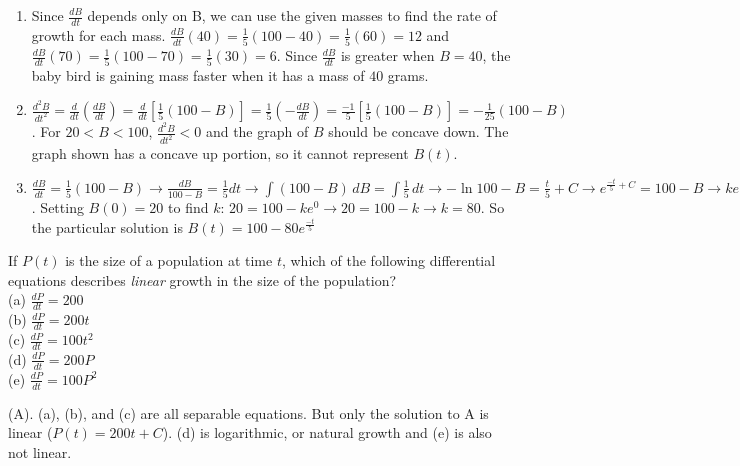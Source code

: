 \begin{Answer}[ref = diffeq2]
\begin{enumerate}
\item Since $\frac{dB}{dt}$ depends only on B, we can use the given masses to 
find the rate of growth for each mass. $\frac{dB}{dt}(40) = \frac{1}{5} \left( 
100 - 40 \right) = \frac{1}{5} \left(60 \right) = 12$ and $\frac{dB}{dt}(70) = 
\frac{1}{5} \left( 100 - 70 \right) = \frac{1}{5} \left( 30 \right) = 6$. 
Since $\frac{dB}{dt}$ is greater when $B = 40$, the baby bird is gaining mass 
faster when it has a mass of $40$ grams. 
\item $\frac{d^2 B}{dt^2} = \frac{d}{dt} \left( \frac{dB}{dt} \right) = 
\frac{d}{dt} \left[ \frac{1}{5} \left(100 - B \right) \right] = \frac{1}{5} 
\left( -\frac{dB}{dt} \right) = \frac{-1}{5} \left[\frac{1}{5} \left( 100 - B 
\right) \right] = -\frac{1}{25} \left(100 - B \right)$. For $20 < B < 100$, 
$\frac{d^2 B}{dt^2} < 0$ and the graph of $B$ should be concave down. The 
graph shown has a concave up portion, so it cannot represent $B(t)$. 
\item $\frac{dB}{dt} = \frac{1}{5} \left( 100 - B \right) \rightarrow 
\frac{dB}{100 - B} = \frac{1}{5} dt \rightarrow \int \left(100 - B \right)\,dB 
= \int \frac{1}{5}\,dt \rightarrow -\ln{100 - B} = \frac{t}{5} + C \rightarrow 
e^{\frac{-t}{5} + C} = 100 - B \rightarrow ke^{\frac{-t}{5}} = 100 - B 
\rightarrow B(t) = 100 - ke^{\frac{-t}{5}}$. Setting $B(0) = 20$ to find $k$: 
$20 = 100 - ke^{0} \rightarrow 20 = 100 - k \rightarrow k = 80$. So the 
particular solution is $B(t) = 100 - 80e^{\frac{-t}{5}}$
\end{enumerate}
\end{Answer}

\begin{Exercise} If $P(t)$ is the size of a 
population at time $t$, which of the following differential equations 
describes \textit{linear} growth in the size of the population?\\
(a) $\frac{dP}{dt} = 200$\\
(b) $\frac{dP}{dt} = 200t$\\
(c) $\frac{dP}{dt} = 100t^2$\\
(d) $\frac{dP}{dt} = 200P$\\
(e) $\frac{dP}{dt} = 100P^2$
\end{Exercise}

\begin{Answer}[ref = popgrowth]
(A). (a), (b), and (c) are all separable equations. But only the solution to A 
is linear ($P(t) = 200t + C$). (d) is logarithmic, or natural growth and (e) 
is also not linear.
\end{Answer}


